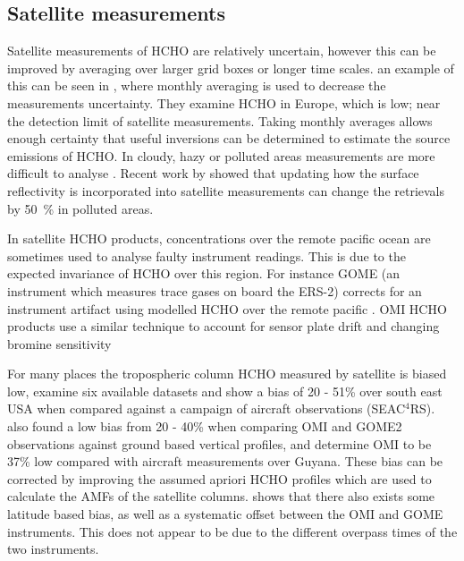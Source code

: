   \subsection{Satellite measurements}
    Satellite measurements of HCHO are relatively uncertain, however this can be improved by averaging over larger grid boxes or longer time scales.
    an example of this can be seen in \citet{Dufour2009}, where monthly averaging is used to decrease the measurements uncertainty.
    They examine HCHO in Europe, which is low; near the detection limit of satellite measurements.
    Taking monthly averages allows enough certainty that useful inversions can be determined to estimate the source emissions of HCHO.
    In cloudy, hazy or polluted areas measurements are more difficult to analyse \citep[e.g.][]{Palmer2003,Marais2014}.
    Recent work by \cite{Vasilkov2017} showed that updating how the surface reflectivity is incorporated into satellite measurements can change the retrievals by 50~\% in polluted areas.
    
    In satellite HCHO products, concentrations over the remote pacific ocean are sometimes used to analyse faulty instrument readings.
    This is due to the expected invariance of HCHO over this region.
    For instance GOME (an instrument which measures trace gases on board the ERS-2) corrects for an instrument artifact using modelled HCHO over the remote pacific \citep{Shim2015}.
    OMI HCHO products use a similar technique to account for sensor plate drift and changing bromine sensitivity \citep{Abad2015}
    
    For many places the tropospheric column HCHO measured by satellite is biased low, \citet{Zhu2016} examine six available datasets and show a bias of 20 - 51\% over south east USA when compared against a campaign of aircraft observations (SEAC$^4$RS).
    \citet{DeSmedt2015} also found a low bias from 20 - 40\% when comparing OMI and GOME2 observations against ground based vertical profiles, and \citet{Barkley2013} determine OMI to be 37\% low compared with aircraft measurements over Guyana.
    These bias can be corrected by improving the assumed apriori HCHO profiles which are used to calculate the AMFs of the satellite columns.
    \cite{Millet2008} shows that there also exists some latitude based bias, as well as a systematic offset between the OMI and GOME instruments.
    This does not appear to be due to the different overpass times of the two instruments.
    
